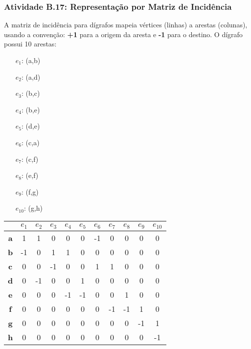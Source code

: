 \documentclass[a4paper,12pt]{article}
\begin{document}
\subsubsection*{Atividade B.17: Representação por Matriz de Incidência}
A matriz de incidência para dígrafos mapeia vértices (linhas) a arestas (colunas), usando a convenção: \textbf{+1} para a origem da aresta e \textbf{-1} para o destino. O dígrafo possui 10 arestas:
\begin{multicols}{2}
\begin{itemize}[nosep, leftmargin=*]
    \item[$e_1$:] (a,b)
    \item[$e_2$:] (a,d)
    \item[$e_3$:] (b,c)
    \item[$e_4$:] (b,e)
    \item[$e_5$:] (d,e)
    \item[$e_6$:] (c,a)
    \item[$e_7$:] (c,f)
    \item[$e_8$:] (e,f)
    \item[$e_9$:] (f,g)
    \item[$e_{10}$:] (g,h)
\end{itemize}
\end{multicols}
\begin{center}
\scriptsize
\begin{tabular*}{\textwidth}{c|@{\extracolsep{\fill}}cccccccccc}
\rowcolor[gray]{0.9}
 & \textbf{$e_1$} & \textbf{$e_2$} & \textbf{$e_3$} & \textbf{$e_4$} & \textbf{$e_5$} & \textbf{$e_6$} & \textbf{$e_7$} & \textbf{$e_8$} & \textbf{$e_9$} & \textbf{$e_{10}$} \\
\hline
\textbf{a} &  1 &  1 &  0 &  0 &  0 & -1 &  0 &  0 &  0 &  0 \\
\textbf{b} & -1 &  0 &  1 &  1 &  0 &  0 &  0 &  0 &  0 &  0 \\
\textbf{c} &  0 &  0 & -1 &  0 &  0 &  1 &  1 &  0 &  0 &  0 \\
\textbf{d} &  0 & -1 &  0 &  0 &  1 &  0 &  0 &  0 &  0 &  0 \\
\textbf{e} &  0 &  0 &  0 & -1 & -1 &  0 &  0 &  1 &  0 &  0 \\
\textbf{f} &  0 &  0 &  0 &  0 &  0 &  0 & -1 & -1 &  1 &  0 \\
\textbf{g} &  0 &  0 &  0 &  0 &  0 &  0 &  0 &  0 & -1 &  1 \\
\textbf{h} &  0 &  0 &  0 &  0 &  0 &  0 &  0 &  0 &  0 & -1 \\
\end{tabular*}
\end{center}
\end{document}
